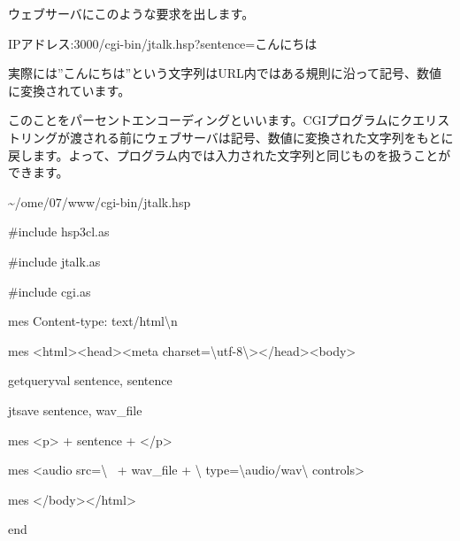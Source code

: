 \documentclass[a4paper,12pt,dvipdfmx]{jarticle}
\begin{document}
\bigskip

%


ウェブサーバにこのような要求を出します。

IPアドレス:3000/cgi-bin/jtalk.hsp?sentence=こんにちは

実際には”こんにちは”という文字列はURL内ではある規則に沿って記号、数値に変換されています。

このことをパーセントエンコーディングといいます。CGIプログラムにクエリストリングが渡される前にウェブサーバは記号、数値に変換された文字列をもとに戻します。よって、プログラム内では入力された文字列と同じものを扱うことができます。

\~{}/ome/07/www/cgi-bin/jtalk.hsp

\centering
\begin{boxedminipage}{\textwidth}
\#include {\textquotedbl}hsp3cl.as{\textquotedbl}

\#include {\textquotedbl}jtalk.as{\textquotedbl}

\#include {\textquotedbl}cgi.as{\textquotedbl}


\bigskip

mes {\textquotedbl}Content-type: text/html{\textbackslash}n{\textquotedbl}

mes {\textquotedbl}{\textless}html{\textgreater}{\textless}head{\textgreater}{\textless}meta
charset={\textbackslash}{\textquotedbl}utf-8{\textbackslash}{\textquotedbl}{\textgreater}{\textless}/head{\textgreater}{\textless}body{\textgreater}{\textquotedbl}


\bigskip

getqueryval {\textquotedbl}sentence{\textquotedbl}, sentence

jtsave sentence, wav\_file

mes {\textquotedbl}{\textless}p{\textgreater}{\textquotedbl} + sentence +
{\textquotedbl}{\textless}/p{\textgreater}{\textquotedbl}


\bigskip

mes {\textquotedbl}{\textless}audio src={\textbackslash}{\textquotedbl}{\textquotedbl} \ + wav\_file +
{\textquotedbl}{\textbackslash}{\textquotedbl}
type={\textbackslash}{\textquotedbl}audio/wav{\textbackslash}{\textquotedbl} controls{\textgreater}{\textquotedbl}

mes {\textquotedbl}{\textless}/body{\textgreater}{\textless}/html{\textgreater}{\textquotedbl}

end
\end{boxedminipage}
\flushleft
\end{document}
